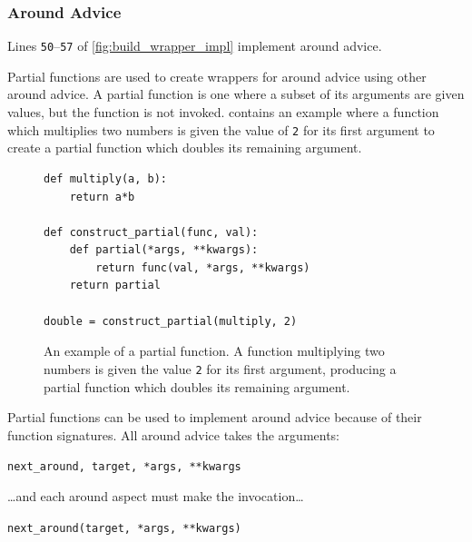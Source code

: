 \subsubsection{Around Advice}

Lines \texttt{50}--\texttt{57} of \cref{fig:build_wrapper_impl} implement around advice.

Partial functions are used to create wrappers for around advice using other
around advice. A partial function is one where a subset of its arguments are
given values, but the function is not invoked.
 contains an example where a function
which multiplies two numbers is given the value of \lstinline{2} for its first
argument to create a partial function which doubles its remaining argument.

\begin{figure}
\begin{lstlisting}[style=footnotesize_python]
def multiply(a, b):
    return a*b

def construct_partial(func, val):
    def partial(*args, **kwargs):
        return func(val, *args, **kwargs)
    return partial

double = construct_partial(multiply, 2)
\end{lstlisting}
\caption{An example of a partial function. A function multiplying two numbers is
given the value \lstinline{2} for its first argument, producing a partial
function which doubles its remaining argument.}
\label{fig:partial_function_explanation}
\end{figure}

Partial functions can be used to implement around advice because of their
function signatures. All around advice takes the arguments:

{\centering

\lstinline{next_around, target, *args, **kwargs}

}

\ldots{}and each around aspect must make the invocation\ldots{}

{\centering

\lstinline{next_around(target, *args, **kwargs)}

}

